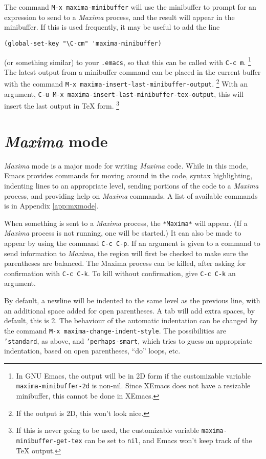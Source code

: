 \documentclass{article}
\newcommand{\mx}{\textsl{\sffamily Maxima}}
\begin{document}
The command \texttt{M-x maxima-minibuffer} will use the minibuffer to
prompt for an expression to send to a \mx{} process, and the result
will appear in the minibuffer.  If this is used frequently, it may be
useful to add the line
\begin{verbatim}
(global-set-key "\C-cm" 'maxima-minibuffer)
\end{verbatim}
(or something similar) to your \texttt{.emacs}, so that this can be
called with \texttt{C-c m}.%
\footnote{In GNU Emacs, the output will be in 2D form if the
customizable variable \texttt{maxima-minibuffer-2d} is non-nil.  Since
XEmacs does not have a resizable minibuffer, this cannot be done in
XEmacs.} 
The latest output from a minibuffer command can be placed in the
current buffer with the command
\texttt{M-x maxima-insert-last-minibuffer-output}.%
\footnote{If the output is 2D, this won't look nice.}
With an argument, \texttt{C-u M-x
  maxima-insert-last-minibuffer-tex-output}, this will insert the last
output in \TeX{} form.%
\footnote{If this is never going to be used, the customizable variable 
\texttt{maxima-minibuffer-get-tex} can be set to \texttt{nil}, and
Emacs won't keep track of the \TeX{} output.}

\section{\mx{} mode}

\mx{} mode is a major mode for writing \mx{} code.  While in this
mode, Emacs provides commands for moving around in the code, syntax
highlighting, indenting lines to an appropriate level, sending
portions of the code to a \mx{} process, and providing help on \mx{}
commands.  A list of available commands is in Appendix
\ref{app:mxmode}.

When something is sent to a \mx{} process, the \texttt{*Maxima*} will
appear.  (If a \mx{} process is not running, one will be started.)  It
can also be made to appear by using the command \texttt{C-c C-p}.  If
an argument is given to a command to send information to \mx{}, the
region will first be checked to make sure the parentheses are
balanced.  The Maxima process can be killed, after asking for
confirmation with \texttt{C-c C-k}.  To kill without confirmation, give
\texttt{C-c C-k} an argument.

By default, a newline will be indented to the same level as the
previous line, with an additional space added for open parentheses.  A
tab will add extra spaces, by default, this is 2.  The behaviour of
the automatic indentation can be changed by the command \texttt{M-x
  maxima-change-indent-style}.  The possibilities are
\texttt{'standard}, as above, and \texttt{'perhaps-smart}, which tries
to guess an appropriate indentation, based on open parentheses, ``do''
loops, etc.
\end{document}
